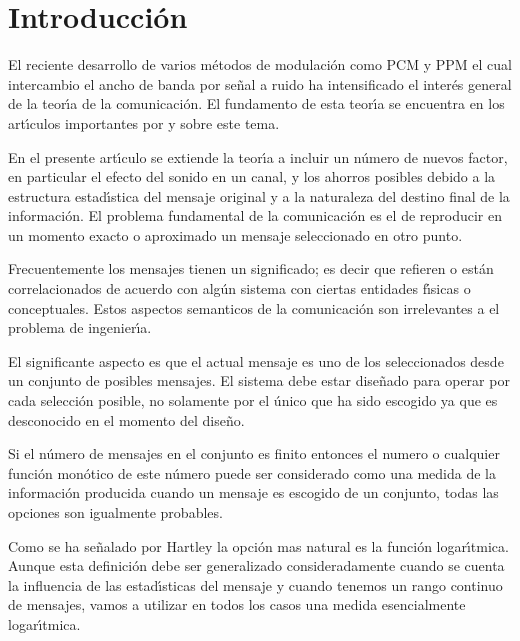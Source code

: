 \chapter*{Introducci\'{o}n}

El reciente desarrollo de varios m\'{e}todos de modulaci\'{o}n como
PCM y PPM el cual intercambio el ancho de banda por se\~{n}al a ruido
ha intensificado el inter\'{e}s general de la teor\'{\i}a de la
comunicaci\'{o}n. El fundamento de esta teor\'{\i}a se encuentra en
los art\'{\i}culos importantes por \citet{Nyquist1} y \citet{Hartley}
sobre este tema.

En el presente art\'{\i}culo se extiende la teor\'{\i}a a incluir un
n\'{u}mero de nuevos factor, en particular el efecto del sonido en un
canal, y los ahorros posibles debido a la estructura estad\'{\i}stica
del mensaje original y a la naturaleza del destino final de la
informaci\'{o}n. El problema fundamental de la comunicaci\'{o}n es el
de reproducir en un momento exacto o aproximado un mensaje
seleccionado en otro punto.

Frecuentemente los mensajes tienen un significado; es decir que
refieren o est\'{a}n correlacionados de acuerdo con alg\'{u}n sistema con
ciertas entidades f\'{\i}sicas o conceptuales. Estos aspectos
semanticos de la comunicaci\'{o}n son irrelevantes a el problema de
ingenier\'{\i}a.

El significante aspecto es que el actual mensaje es uno de los
seleccionados desde un conjunto de posibles mensajes. El sistema debe
estar dise\~{n}ado para operar por cada selecci\'{o}n posible, no
solamente por el \'{u}nico que ha sido escogido ya que es desconocido
en el momento del dise\~{n}o.

Si el n\'{u}mero de mensajes en el conjunto es finito entonces el
numero o cualquier funci\'{o}n mon\'{o}tico de este n\'{u}mero puede
ser considerado como una medida de la informaci\'{o}n producida cuando
un mensaje es escogido de un conjunto, todas las opciones son
igualmente probables.

Como se ha se\~{n}alado por Hartley la opci\'{o}n mas natural es la
funci\'{o}n logar\'{\i}tmica. Aunque esta definici\'{o}n debe ser
generalizado consideradamente cuando se cuenta la influencia de las
estad\'{\i}sticas del mensaje y cuando tenemos un rango continuo de
mensajes, vamos a utilizar en todos los casos una medida esencialmente
logar\'{\i}tmica.

